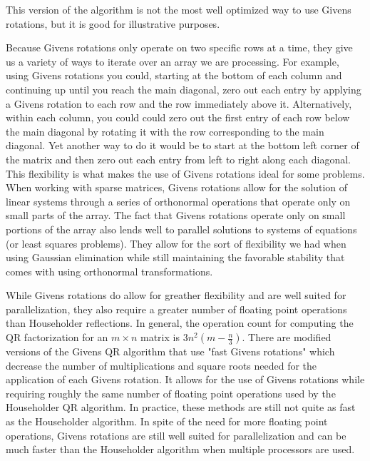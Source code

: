 This version of the algorithm is not the most well optimized way to use Givens rotations, but it is good for illustrative purposes.

Because Givens rotations only operate on two specific rows at a time, they give us a variety of ways to iterate over an array we are processing.
For example, using Givens rotations you could, starting at the bottom of each column and continuing up until you reach the main diagonal, zero out each entry by applying a Givens rotation to each row and the row immediately above it.
Alternatively, within each column, you could could zero out the first entry of each row below the main diagonal by rotating it with the row corresponding to the main diagonal.
Yet another way to do it would be to start at the bottom left corner of the matrix and then zero out each entry from left to right along each diagonal.
This flexibility is what makes the use of Givens rotations ideal for some problems.
When working with sparse matrices, Givens rotations allow for the solution of linear systems through a series of orthonormal operations that operate only on small parts of the array.
The fact that Givens rotations operate only on small portions of the array also lends well to parallel solutions to systems of equations (or least squares problems).
They allow for the sort of flexibility we had when using Gaussian elimination while still maintaining the favorable stability that comes with using orthonormal transformations.

While Givens rotations do allow for greather flexibility and are well suited for parallelization, they also require a greater number of floating point operations than Householder reflections.
In general, the operation count for computing the QR factorization for an $m \times n$ matrix is $3 n^2 \left( m - \frac{n}{3} \right)$.
There are modified versions of the Givens QR algorithm that use "fast Givens rotations" which decrease the number of multiplications and square roots needed for the application of each Givens rotation.
It allows for the use of Givens rotations while requiring roughly the same number of floating point operations used by the Householder QR algorithm.
In practice, these methods are still not quite as fast as the Householder algorithm.
In spite of the need for more floating point operations, Givens rotations are still well suited for parallelization and can be much faster than the Householder algorithm when multiple processors are used.

